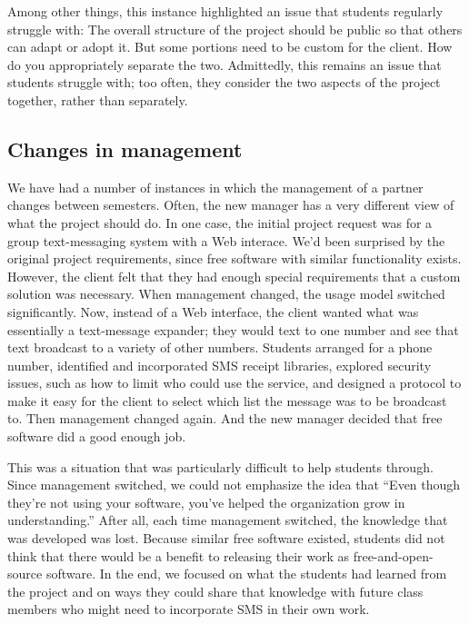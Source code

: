 Among other things, this instance highlighted an issue that students
regularly struggle with: The overall structure of the project should
be public so that others can adapt or adopt it.  But some portions
need to be custom for the client.  How do you appropriately separate the
two.  Admittedly, this remains an issue that students struggle with;
too often, they consider the two aspects of the project together,
rather than separately.

\subsection{Changes in management}

We have had a number of instances in which the management of a
partner changes between semesters.  Often, the new manager has a
very different view of what the project should do.  In one case,
the initial project request was for a group text-messaging system
with a Web interace.  We'd been surprised by the original project
requirements, since free software with similar functionality exists.
However, the client felt that they had enough special requirements
that a custom solution was necessary.  When management changed, the
usage model switched significantly.  Now, instead of a Web interface,
the client wanted what was essentially a text-message expander;
they would text to one number and see that text broadcast to a
variety of other numbers.  Students arranged for a phone number,
identified and incorporated SMS receipt libraries, explored security
issues, such as how to limit who could use the service, and designed
a protocol to make it easy for the client to select which list the
message was to be broadcast to.  Then management changed again.  And
the new manager decided that free software did a good enough job.

This was a situation that was particularly difficult to help students
through.  Since management switched, we could not emphasize the idea
that ``Even though they're not using your software, you've helped the
organization grow in understanding.'' After all, each time management 
switched, the knowledge that was developed was lost.   Because similar
free software existed, students did not think that there would be
a benefit to releasing their work as free-and-open-source software.
In the end, we focused on what the students had learned from the project
and on ways they could share that knowledge with future class members
who might need to incorporate SMS in their own work.

